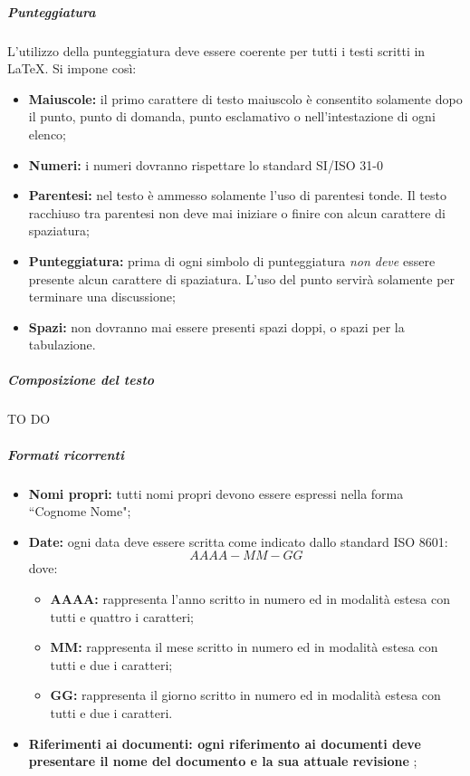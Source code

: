 				\subparagraph{Punteggiatura}
				L'utilizzo della punteggiatura deve essere coerente per tutti i testi scritti in \LaTeX. Si impone così:
				\begin{itemize}
					\item \textbf{Maiuscole:} il primo carattere di testo maiuscolo è consentito solamente dopo il punto, punto di domanda, punto esclamativo o nell'intestazione di ogni elenco;
					\item \textbf{Numeri:} i numeri dovranno rispettare lo standard SI/ISO 31-0 
					\item \textbf{Parentesi:} nel testo è ammesso solamente l'uso di parentesi tonde. Il testo racchiuso tra parentesi non deve mai iniziare o finire con alcun carattere di spaziatura;
					\item \textbf{Punteggiatura:} prima di ogni simbolo di punteggiatura \emph{non deve} essere presente alcun carattere di spaziatura. L'uso del punto servirà solamente per terminare una discussione;
					\item \textbf{Spazi:} non dovranno mai essere presenti spazi doppi, o spazi per la tabulazione.
				\end{itemize}				
				
				\subparagraph{Composizione del testo} TO DO
				
				\subparagraph{Formati ricorrenti}
				\begin{itemize}
					\item \textbf{Nomi propri:} tutti nomi propri devono essere espressi nella forma ``Cognome Nome";
					\item \textbf{Date:} ogni data deve essere scritta come indicato dallo standard ISO 8601:\\
						\begin{displaymath}
							AAAA-MM-GG
						\end{displaymath}
						dove:
						\begin{itemize}
							\item \textbf{AAAA:} rappresenta l'anno scritto in numero ed in modalità estesa con tutti e quattro i caratteri;
							\item \textbf{MM:} rappresenta il mese scritto in numero ed in modalità estesa con tutti e due i caratteri;
							\item \textbf{GG:} rappresenta il giorno scritto in numero ed in modalità estesa con tutti e due i caratteri.
						\end{itemize}
						\item \textbf{Riferimenti ai documenti: ogni riferimento ai documenti deve presentare il nome del documento e la sua attuale revisione} ;
				\end{itemize}

